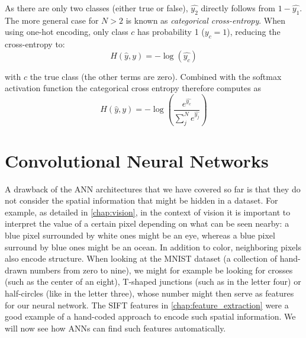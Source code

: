 As there are only two classes (either true or false), $\hat{y_2}$ directly follows from $1-\hat{y_1}$.
The more general case for $N>2$ is known as \textsl{categorical cross-entropy}.
%
When using one-hot encoding, only class $c$ has probability 1 ($y_c=1$), reducing the cross-entropy to:
\begin{equation}
H(\hat{y},y)=-\log(\hat{y_c})
\end{equation}

with $c$ the true class (the other terms are zero). 
Combined with the softmax activation function the categorical cross entropy therefore computes as
\begin{equation}
H(\hat{y},y) = -\log\left(\frac{e^{\hat{y_c}}}{\sum_{j}^N e^{\hat{y_j}}}\right)
\end{equation}

\section{Convolutional Neural Networks}\label{sec:ann:cnn}

A drawback of the ANN architectures that we have covered so far is that they do not consider the spatial information that might be hidden in a dataset.
For example, as detailed in \cref{chap:vision}, in the context of vision it is important to interpret the value of a certain pixel depending on what can be seen nearby: a blue pixel surrounded by white ones might be an eye, whereas a blue pixel surround by blue ones might be an ocean. In addition to color, neighboring pixels also encode structure. When looking at the MNIST dataset (a collection of hand-drawn numbers from zero to nine), we might for example be looking for crosses (such as the center of an eight), T-shaped junctions (such as in the letter four) or half-circles (like in the letter three), whose number might then serve as features for our neural network.
The SIFT features in \cref{chap:feature_extraction} were a good example of a hand-coded approach to encode such spatial information. We will now see how ANNs can find such features automatically.

